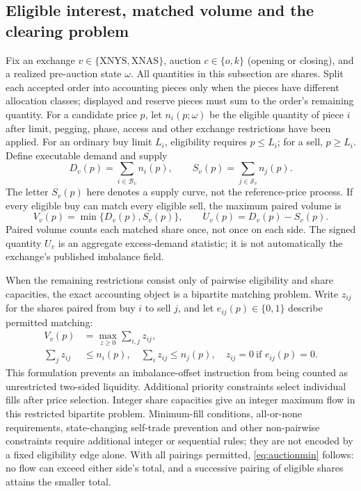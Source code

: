 \documentclass[11pt]{article}
\numberwithin{equation}{section}
\theoremstyle{definition}
\theoremstyle{remark}
\theoremstyle{definition}
\begin{document}
\subsection{Eligible interest, matched volume and the clearing problem}
\label{sec:auctionmath}

Fix an exchange $v\in\{\mathrm{XNYS},\mathrm{XNAS}\}$, auction $c\in\{o,k\}$
(opening or closing), and a realized pre-auction state $\omega$. All quantities
in this subsection are shares. Split each accepted order into accounting
pieces only when the pieces have different allocation classes; displayed and
reserve pieces must sum to the order's remaining quantity. For a candidate
price $p$, let $n_i(p;\omega)$ be the eligible quantity of piece $i$ after limit,
pegging, phase, access and other exchange restrictions have been applied.
For an ordinary buy limit $L_i$, eligibility requires $p\leq L_i$; for a sell,
$p\geq L_i$. Define executable demand and supply
\begin{equation}\label{eq:auctioncurves}
 D_v(p)=\sum_{i\in\mathcal B_v}n_i(p),\qquad
 S_v(p)=\sum_{j\in\mathcal S_v}n_j(p).
\end{equation}
The letter $S_v(p)$ here denotes a supply curve, not the reference-price process.
If every eligible buy can match every eligible sell, the maximum paired volume is
\begin{equation}\label{eq:auctionmin}
 V_v(p)=\min\{D_v(p),S_v(p)\},\qquad
 U_v(p)=D_v(p)-S_v(p).
\end{equation}
Paired volume counts each matched share once, not once on each side. The signed
quantity $U_v$ is an aggregate excess-demand statistic; it is not automatically
the exchange's published imbalance field.

When the remaining restrictions consist only of pairwise eligibility and
share capacities, the exact accounting object is a bipartite matching problem. Write $z_{ij}$ for the shares paired from buy
$i$ to sell $j$, and let $e_{ij}(p)\in\{0,1\}$ describe permitted matching:
\begin{align}\label{eq:auctionflow}
 V_v(p)&=\max_{z\geq0}\sum_{i,j}z_{ij},\\
 \sum_jz_{ij}&\leq n_i(p),\quad
 \sum_iz_{ij}\leq n_j(p),\quad
 z_{ij}=0\ \text{if }e_{ij}(p)=0.\nonumber
\end{align}
This formulation prevents an imbalance-offset instruction from being counted
as unrestricted two-sided liquidity. Additional priority constraints select
individual fills after price selection. Integer share capacities give an integer
maximum flow in this restricted bipartite problem. Minimum-fill conditions,
all-or-none requirements, state-changing self-trade prevention and other
non-pairwise constraints require additional integer or sequential rules; they
are not encoded by a fixed eligibility edge alone. With all pairings permitted,
\eqref{eq:auctionmin} follows: no flow can exceed either side's total, and a
successive pairing of eligible shares attains the smaller total.
\end{document}
